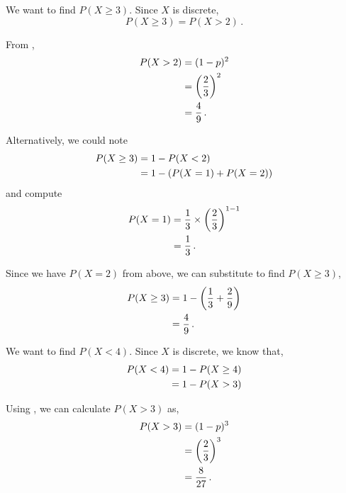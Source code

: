 \begin{subquestions}
\begin{subsubquestions}
\begin{subsubsubquestions}

\subsubsubquestion

We want to find $P(X\geq3)$. Since $X$ is discrete, 
\begin{equation}
	P(X\geq3) = P(X>2) \,.
\end{equation}

From ,
\begin{align}
	P(X > 2) & = (1-p)^2 \nonumber \\
	         & = \left(\frac{2}{3}\right)^2 \nonumber \\
	         & = \frac{4}{9} \,.
\end{align}

Alternatively, we could note
\begin{align}
	P(X\geq 3) &= 1 - P(X<2) \nonumber\\
				  &= 1 - \left( P(X=1) + P(X=2) \right)
\end{align}
and compute
\begin{align}
	P(X=1) &= \frac{1}{3}\times \left(\frac{2}{3}\right)^{1-1} \nonumber\\
			 &= \frac{1}{3} \,.
\end{align}

Since we have $P(X=2)$ from above, we can substitute to find $P(X\geq 3)$,
\begin{align}
	P(X\geq 3) &= 1 - \left( \frac{1}{3} + \frac{2}{9} \right) \nonumber\\
				  &= \frac{4}{9} \,.
\end{align}





\subsubsubquestion

We want to find $P(X<4)$. Since $X$ is discrete, we know that,
\begin{align}
	P(X < 4) &= 1 - P(X \geq 4) \nonumber\\
	         &= 1 - P(X >3)
\end{align}

Using , we can calculate $P(X>3)$ as,
\begin{align}
	P(X > 3) & = (1-p)^3 \nonumber \\
		   	 & = \left(\frac{2}{3}\right)^3 \nonumber \\
			 & = \frac{8}{27} \,.
\end{align}


\end{subsubsubquestions}
\end{subsubquestions}
\end{subquestions}
